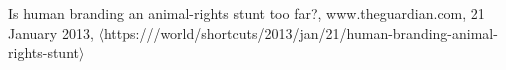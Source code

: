 \begin{thebibliography}{1}

  Is human branding an animal-rights stunt too far?,
  www.theguardian.com,
  21 January 2013,
  $\langle$https:///world/shortcuts/2013/jan/21/human-branding-animal-rights-stunt$\rangle$

\end{thebibliography}
